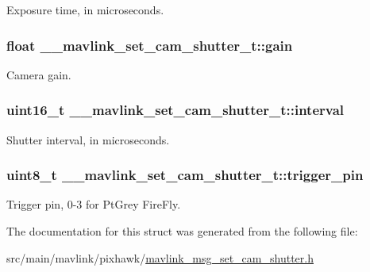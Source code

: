 Exposure time, in microseconds. 

\hypertarget{struct____mavlink__set__cam__shutter__t_ab5364d724faec2e008e7938331492f81}{
\subsubsection[{gain}]{\setlength{\rightskip}{0pt plus 5cm}float \+\_\+\+\_\+mavlink\+\_\+set\+\_\+cam\+\_\+shutter\+\_\+t\+::gain}}\label{struct____mavlink__set__cam__shutter__t_ab5364d724faec2e008e7938331492f81}


Camera gain. 

\hypertarget{struct____mavlink__set__cam__shutter__t_a47229d8a46bcfdeebee87c6c8a7ecea7}{
\subsubsection[{interval}]{\setlength{\rightskip}{0pt plus 5cm}uint16\+\_\+t \+\_\+\+\_\+mavlink\+\_\+set\+\_\+cam\+\_\+shutter\+\_\+t\+::interval}}\label{struct____mavlink__set__cam__shutter__t_a47229d8a46bcfdeebee87c6c8a7ecea7}


Shutter interval, in microseconds. 

\hypertarget{struct____mavlink__set__cam__shutter__t_a126d28c52fce8dc369623e23b7b1da82}{
\subsubsection[{trigger\+\_\+pin}]{\setlength{\rightskip}{0pt plus 5cm}uint8\+\_\+t \+\_\+\+\_\+mavlink\+\_\+set\+\_\+cam\+\_\+shutter\+\_\+t\+::trigger\+\_\+pin}}\label{struct____mavlink__set__cam__shutter__t_a126d28c52fce8dc369623e23b7b1da82}


Trigger pin, 0-\/3 for Pt\+Grey Fire\+Fly. 



The documentation for this struct was generated from the following file\+:\begin{DoxyCompactItemize}
\item 
src/main/mavlink/pixhawk/\hyperlink{mavlink__msg__set__cam__shutter_8h}{mavlink\+\_\+msg\+\_\+set\+\_\+cam\+\_\+shutter.\+h}\end{DoxyCompactItemize}
